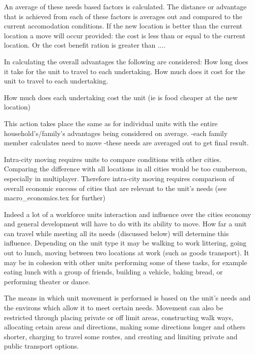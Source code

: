 An average of these needs based factors is calculated. The distance or advantage that is achieved from each of these factors is averages out and compared to the current accomodation conditions. If the new location is better than the current location a move will occur provided: the cost is less than or equal to the current location. Or the cost benefit ration is greater than ....

In calculating the overall advantages the following are considered:
  How long does it take for the unit to travel to each undertaking.
  How much does it cost for the unit to travel to each undertaking.

  How much does each undertaking cost the unit (ie is food cheaper at the new location)




This action takes place the same as for individual units with the entire household's/family's advantages being considered on average.
-each family member calculates need to move
-these needs are averaged out to get final result. 


Intra-city moving requires units to compare conditions with other cities. Comparing the difference with all locations in all cities would be too cumberson, especially in multiplayer. Therefore intra-city moving requires comparison of overall economic success of cities that are relevant to the unit's needs (see macro_economics.tex for further)







Indeed a lot of a workforce units interaction and influence over the cities economy and general development will have to do with its ability to move. How far a unit can travel while meeting all its needs (discussed below) will determine this influence. Depending on the unit type it may be walking to work littering, going out to lunch, moving between two locations at work (such as goods transport). It may be in cohesion with other units performing some of these tasks, for example eating lunch with a group of friends, building a vehicle, baking bread, or performing theater or dance. 

The means in which unit movement is performed is based on the unit's needs and the environs which allow it to meet certain needs. Movement can also be restricted through placing private or off limit areas, constructing walk ways, allocating cetain areas and directions, making some directions longer and others shorter, charging to travel some routes, and creating and limiting private and public transport options. 


 
